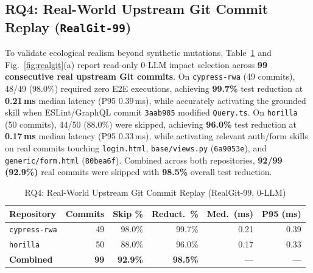 \documentclass[conference]{IEEEtran}
\begin{document}
\subsection{RQ4: Real-World Upstream Git Commit Replay (\texttt{RealGit-99})}
To validate ecological realism beyond synthetic mutations, Table~\ref{tab:realgit} and Fig.~\ref{fig:realgit}(a) report read-only 0-LLM impact selection across \textbf{99 consecutive real upstream Git commits}. On \texttt{cypress-rwa} (49 commits), 48/49 (98.0\%) required zero E2E executions, achieving \textbf{99.7\%} test reduction at \textbf{0.21\,ms} median latency (P95 0.39\,ms), while accurately activating the grounded skill when ESLint/GraphQL commit \texttt{3aab985} modified \texttt{Query.ts}. On \texttt{horilla} (50 commits), 44/50 (88.0\%) were skipped, achieving \textbf{96.0\%} test reduction at \textbf{0.17\,ms} median latency (P95 0.33\,ms), while activating relevant auth/form skills on real commits touching \texttt{login.html}, \texttt{base/views.py} (\texttt{6a9053e}), and \texttt{generic/form.html} (\texttt{80bea6f}). Combined across both repositories, \textbf{92/99 (92.9\%)} real commits were skipped with \textbf{98.5\%} overall test reduction.

\begin{table}[t]
\centering
\caption{RQ4: Real-World Upstream Git Commit Replay (RealGit-99, 0-LLM)}
\label{tab:realgit}
\begin{tabular}{lrrrrr}
\toprule
Repository & Commits & Skip \% & Reduct.\ \% & Med.\ (ms) & P95 (ms) \\
\midrule
\texttt{cypress-rwa} & 49 & 98.0\% & 99.7\% & 0.21 & 0.39 \\
\texttt{horilla} & 50 & 88.0\% & 96.0\% & 0.17 & 0.33 \\
\midrule
\textbf{Combined} & \textbf{99} & \textbf{92.9\%} & \textbf{98.5\%} & --- & --- \\
\bottomrule
\end{tabular}
\end{table}
\end{document}
